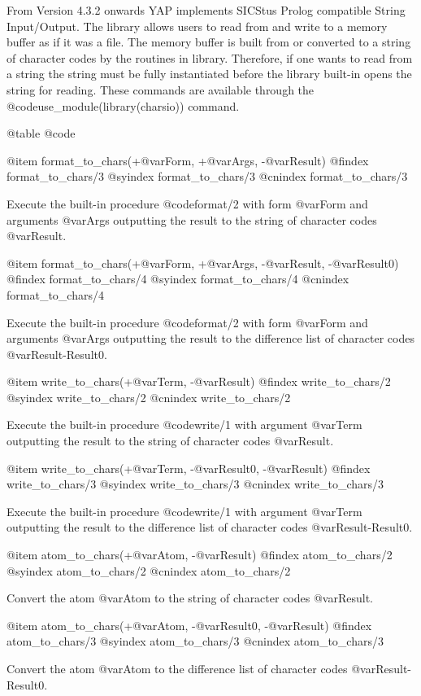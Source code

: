 From Version 4.3.2 onwards YAP implements SICStus Prolog compatible
String Input/Output. The library allows users to read from and write to a memory
buffer as if it was a file. The memory buffer is built from or converted
to a string of character codes by the routines in library. Therefore, if
one wants to read from a string the string must be fully instantiated
before the library built-in opens the string for reading. These commands
are available through the @code{use_module(library(charsio))} command.

@table @code

@item format_to_chars(+@var{Form}, +@var{Args}, -@var{Result})
@findex format_to_chars/3
@syindex format_to_chars/3
@cnindex format_to_chars/3

Execute the built-in procedure @code{format/2} with form @var{Form} and
arguments @var{Args} outputting the result to the string of character
codes @var{Result}.

@item format_to_chars(+@var{Form}, +@var{Args}, -@var{Result}, -@var{Result0})
@findex format_to_chars/4
@syindex format_to_chars/4
@cnindex format_to_chars/4

Execute the built-in procedure @code{format/2} with form @var{Form} and
arguments @var{Args} outputting the result to the difference list of
character codes @var{Result-Result0}.

@item write_to_chars(+@var{Term}, -@var{Result})
@findex write_to_chars/2
@syindex write_to_chars/2
@cnindex write_to_chars/2

Execute the built-in procedure @code{write/1} with argument @var{Term}
outputting the result to the string of character codes @var{Result}.

@item write_to_chars(+@var{Term}, -@var{Result0}, -@var{Result})
@findex write_to_chars/3
@syindex write_to_chars/3
@cnindex write_to_chars/3

Execute the built-in procedure @code{write/1} with argument @var{Term}
outputting the result to the difference list of character codes
@var{Result-Result0}.

@item atom_to_chars(+@var{Atom}, -@var{Result})
@findex atom_to_chars/2
@syindex atom_to_chars/2
@cnindex atom_to_chars/2

Convert the atom @var{Atom} to the string of character codes
@var{Result}.

@item atom_to_chars(+@var{Atom}, -@var{Result0}, -@var{Result})
@findex atom_to_chars/3
@syindex atom_to_chars/3
@cnindex atom_to_chars/3

Convert the atom @var{Atom} to the difference list of character codes
@var{Result-Result0}.

